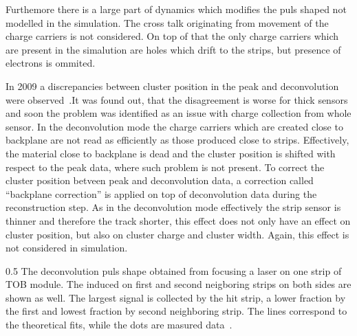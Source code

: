 Furthemore there is a large part of dynamics which modifies the puls shaped not modelled in the simulation. The cross talk originating from movement of the charge carriers is not considered. On top of that the only charge carriers which are present in the simalution are holes which drift to the strips, but presence of electrons is ommited.

In 2009 a discrepancies between cluster position in the peak and deconvolution were observed~\cite{website:backplane}.It was found out, that the disagreement is worse for thick sensors and soon the problem was identified as an issue with charge collection from whole sensor. In the deconvolution mode the charge carriers which are created close to backplane are not read as efficiently as those produced close to strips. Effectively, the material close to backplane is dead and the cluster position is shifted with respect to the peak data, where such problem is not present. To correct the cluster position betveen peak and deconvolution data, a correction called ``backplane correction'' is applied on top of deconvolution data during the reconstruction step. As in the deconvolution mode effectively the strip sensor is thinner and therefore the track shorter, this effect does not only have an effect on cluster position, but also on cluster charge and cluster width. Again, this effect is not considered in simulation.



                 {0.5}       %
                 { The deconvolution puls shape obtained from focusing a laser on one strip of TOB module. The induced on first and second neigboring strips on both sides are shown as well.  The largest signal is collected by the hit strip, a lower fraction by the first and lowest fraction by second neighboring strip. The lines correspond to the theoretical fits, while the dots are masured data~\cite{Delaere:1061284}.  }


